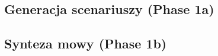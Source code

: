 %

\subsection{Generacja scenariuszy (Phase 1a)}\label{sec:scenariusze}

%
%
%
%
%
%

\subsection{Synteza mowy (Phase 1b)}\label{sec:tts}

